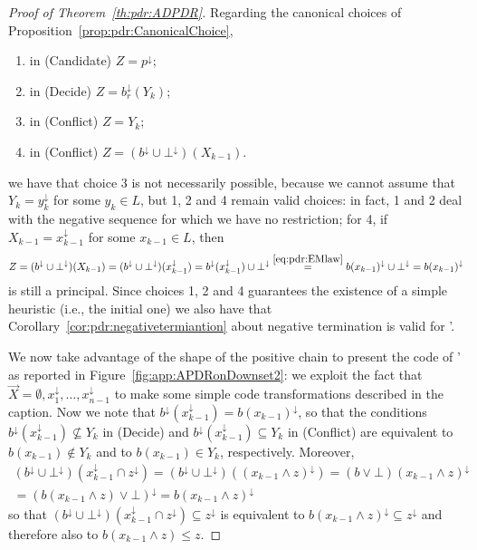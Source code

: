\begin{proof}[Proof of Theorem~\ref{th:pdr:ADPDR}]
	Regarding the canonical choices of Proposition~\ref{prop:pdr:CanonicalChoice},
	\begin{enumerate}
		\item in (Candidate) $Z=p^\downarrow$;
		\item in (Decide) $Z= b_r^\downarrow(Y_k)$;
		\item in (Conflict) $Z = Y_k$;
		\item in (Conflict) $Z = (b^\downarrow \cup \bot^\downarrow)(X_{k-1})$.
	\end{enumerate}
	\noindent
	we have that choice 3 is not necessarily possible, because we cannot assume that $Y_k=y_k^\downarrow$ for some $y_k\in L$, but 1, 2 and 4 remain valid choices: in fact,
	1 and 2 deal with the negative sequence for which we have no restriction; for 4, if $X_{k-1} = x_{k-1}^\downarrow$ for some $x_{k-1}\in L$, then
	\[
	Z=(b^\downarrow \cup \bot^\downarrow)(X_{k-1}) =(b^\downarrow \cup \bot^\downarrow)(x_{k-1}^\downarrow) =b^\downarrow(x_{k-1}^\downarrow) \cup \bot^\downarrow \stackrel{\eqref{eq:pdr:EMlaw}}{=}b(x_{k-1})^\downarrow \cup \bot^\downarrow =b(x_{k-1})^\downarrow
	\]
	is still a principal.
	Since choices 1, 2 and 4 guarantees the existence of a simple heuristic (i.e., the initial one) we also have that Corollary~\ref{cor:pdr:negativetermiantion} about negative termination is valid for {\APDR'}.

	We now take advantage of the shape of the positive chain to present the code of {\APDR'} as reported in Figure~\ref{fig:app:APDRonDownset2}: we exploit the fact that $\vec{X}=\emptyset, x_1^\downarrow,\dots,x_{n-1}^\downarrow$ to make some simple code transformations described in the caption. Now we note that $b^\downarrow(x^\downarrow_{k-1})=b(x_{k-1})^\downarrow$, so that the conditions $b^\downarrow(x^\downarrow_{k-1}) \not \subseteq Y_k$ in (Decide) and $b^\downarrow(x^\downarrow_{k-1}) \subseteq Y_k$ in (Conflict) are equivalent to $b(x_{k-1})\not \in Y_k$ and to $b(x_{k-1}) \in Y_k$, respectively.
	Moreover,
	\begin{gather*}
		(b^\downarrow \cup \bot^\downarrow)(x^\downarrow_{k-1} \cap z^\downarrow) = (b^\downarrow \cup \bot^\downarrow)((x_{k-1} \land z)^\downarrow) = (b \lor \bot)(x_{k-1} \land z)^\downarrow \\
		= (b (x_{k-1} \land z)\lor \bot)^\downarrow = b (x_{k-1} \land z)^\downarrow
	\end{gather*}
	so that $(b^\downarrow \cup \bot^\downarrow)(x^\downarrow_{k-1} \cap z^\downarrow) \subseteq z^\downarrow$ is equivalent to  $b (x_{k-1} \land z)^\downarrow\subseteq z^\downarrow$ and therefore also to $b(x_{k-1} \land z) \leq z$.


\end{proof}
